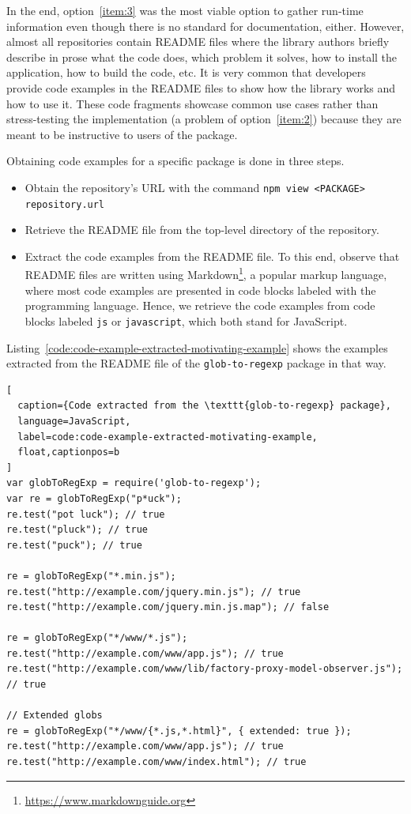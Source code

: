 \documentclass[sigplan,screen]{acmart}
\newcommand{\coderef}[1]{Listing~\ref{#1}}
\begin{document}
In the end, option~\ref{item:3} was the most viable option to gather run-time information
even though there is no standard for documentation, either. However, almost all repositories
contain README files where the library authors briefly describe in prose what
the code does, which problem it solves, how to install the
application, how to build the code, etc. It is very common that
developers provide code examples in the README files to show how the
library works and how to use it. These code fragments showcase common use cases rather
than stress-testing the implementation (a problem of
option~\ref{item:2}) because they are meant to be instructive to users of the package.


Obtaining code examples for a specific \NPM{} package is done in three steps.
\begin{itemize}
\item Obtain the  repository's URL with the command
  \texttt{npm view <PACKAGE> repository.url}

\item Retrieve the README file from the top-level directory of the repository.

\item Extract the code examples from the README file. To this end,
  observe that README files are
  written using Markdown\footnote{\url{https://www.markdownguide.org}}, a
  popular markup language, where most
  code examples are presented in code blocks labeled with the programming
  language. Hence, we
  retrieve the code examples from code blocks labeled \texttt{js} or
  \texttt{javascript}, which both stand for JavaScript.
\end{itemize}

\coderef{code:code-example-extracted-motivating-example} shows
the examples extracted from  the README file of the \texttt{glob-to-regexp} package in
that way.

\begin{lstlisting}[
  caption={Code extracted from the \texttt{glob-to-regexp} package},
  language=JavaScript,
  label=code:code-example-extracted-motivating-example,
  float,captionpos=b
]
var globToRegExp = require('glob-to-regexp');
var re = globToRegExp("p*uck");
re.test("pot luck"); // true
re.test("pluck"); // true
re.test("puck"); // true

re = globToRegExp("*.min.js");
re.test("http://example.com/jquery.min.js"); // true
re.test("http://example.com/jquery.min.js.map"); // false

re = globToRegExp("*/www/*.js");
re.test("http://example.com/www/app.js"); // true
re.test("http://example.com/www/lib/factory-proxy-model-observer.js"); // true

// Extended globs
re = globToRegExp("*/www/{*.js,*.html}", { extended: true });
re.test("http://example.com/www/app.js"); // true
re.test("http://example.com/www/index.html"); // true
\end{lstlisting}
\end{document}
